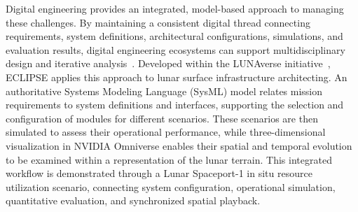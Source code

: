 \documentclass[10pt]{article}
\begin{document}
Digital engineering provides an integrated, model-based approach to managing these challenges. By maintaining a consistent digital thread connecting requirements, system definitions, architectural configurations, simulations, and evaluation results, digital engineering ecosystems can support multidisciplinary design and iterative analysis~\cite{dod_digital_engineering_2023}. Developed within the LUNAverse initiative~\cite{mueller_lunaverse_preprint_2026}, ECLIPSE applies this approach to lunar surface infrastructure architecting. An authoritative Systems Modeling Language (SysML) model relates mission requirements to system definitions and interfaces, supporting the selection and configuration of modules for different scenarios. These scenarios are then simulated to assess their operational performance, while three-dimensional visualization in NVIDIA Omniverse enables their spatial and temporal evolution to be examined within a representation of the lunar terrain. This integrated workflow is demonstrated through a Lunar Spaceport-1 in situ resource utilization scenario, connecting system configuration, operational simulation, quantitative evaluation, and synchronized spatial playback.
\end{document}

